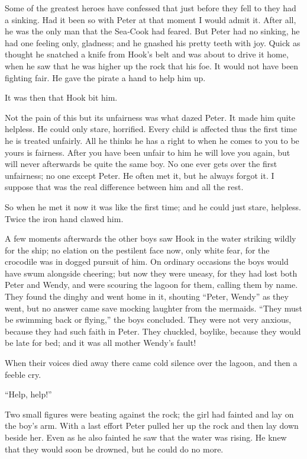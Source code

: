 Some of the greatest heroes have confessed that just before they fell to they had a sinking.
Had it been so with Peter at that moment I would admit it.
After all, he was the only man that the Sea‐Cook had feared.
But Peter had no sinking, he had one feeling only, gladness;
and he gnashed his pretty teeth with joy.
Quick as thought he snatched a knife from Hook’s belt and was about to drive it home,
when he saw that he was higher up the rock that his foe.
It would not have been fighting fair.
He gave the pirate a hand to help him up.

It was then that Hook bit him.

Not the pain of this but its unfairness was what dazed Peter.
It made him quite helpless.
He could only stare, horrified.
Every child is affected thus the first time he is treated unfairly.
All he thinks he has a right to when he comes to you to be yours is fairness.
After you have been unfair to him he will love you again,
but will never afterwards be quite the same boy.
No one ever gets over the first unfairness;
no one except Peter.
He often met it, but he always forgot it.
I suppose that was the real difference between him and all the rest.

So when he met it now it was like the first time;
and he could just stare, helpless.
Twice the iron hand clawed him.

A few moments afterwards the other boys saw Hook in the water striking wildly for the ship;
no elation on the pestilent face now, only white fear,
for the crocodile was in dogged pursuit of him.
On ordinary occasions the boys would have swum alongside cheering;
but now they were uneasy, for they had lost both Peter and Wendy,
and were scouring the lagoon for them, calling them by name.
They found the dinghy and went home in it, shouting “Peter, Wendy” as they went,
but no answer came save mocking laughter from the mermaids.
“They must be swimming back or flying,” the boys concluded.
They were not very anxious, because they had such faith in Peter.
They chuckled, boylike, because they would be late for bed;
and it was all mother Wendy’s fault!

When their voices died away there came cold silence over the lagoon, and then a feeble cry.

“Help, help!”

Two small figures were beating against the rock;
the girl had fainted and lay on the boy’s arm.
With a last effort Peter pulled her up the rock and then lay down beside her.
Even as he also fainted he saw that the water was rising.
He knew that they would soon be drowned, but he could do no more.

